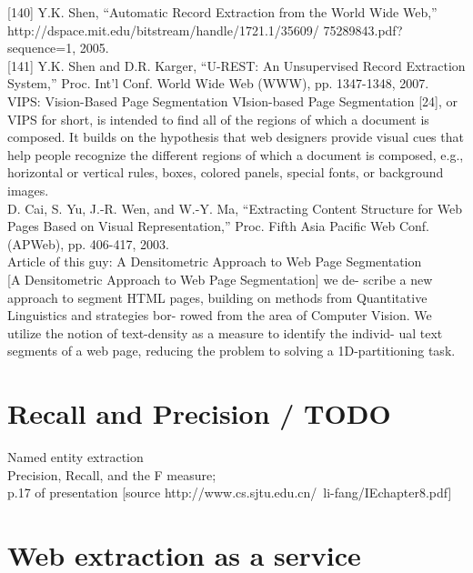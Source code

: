 [140] Y.K. Shen, “Automatic Record Extraction from the World Wide
Web,” http://dspace.mit.edu/bitstream/handle/1721.1/35609/
75289843.pdf?sequence=1, 2005.\\

[141] Y.K. Shen and D.R. Karger, “U-REST: An Unsupervised Record
Extraction System,” Proc. Int’l Conf. World Wide Web (WWW),
pp. 1347-1348, 2007.\\

VIPS: Vision-Based Page Segmentation
VIsion-based Page Segmentation [24], or VIPS for short, is
intended to find all of the regions of which a document is
composed. It builds on the hypothesis that web designers
provide visual cues that help people recognize the different
regions of which a document is composed, e.g., horizontal
or vertical rules, boxes, colored panels, special fonts, or
background images. \\
[24] D. Cai, S. Yu, J.-R. Wen, and W.-Y. Ma, “Extracting Content
Structure for Web Pages Based on Visual Representation,” Proc.
Fifth Asia Pacific Web Conf. (APWeb), pp. 406-417, 2003.\\

Article of this guy: A Densitometric Approach to Web Page Segmentation\\

[A Densitometric Approach to Web Page Segmentation] we de- scribe a new approach to segment HTML pages, building on methods from Quantitative Linguistics and strategies bor- rowed from the area of Computer Vision. We utilize the notion of text-density as a measure to identify the individ- ual text segments of a web page, reducing the problem to solving a 1D-partitioning task.\\




\section{Recall and Precision / TODO}

Named entity extraction\\
Precision, Recall, and the
F measure;\\
p.17 of presentation
[source http://www.cs.sjtu.edu.cn/~li-fang/IEchapter8.pdf]

\section{Web extraction as a service}

